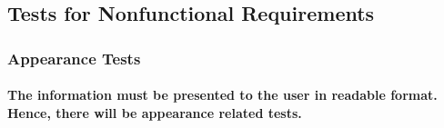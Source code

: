 \documentclass[12pt, titlepage]{article}
\begin{document}
\subsection{Tests for Nonfunctional Requirements}

\subsubsection{Appearance Tests}
\paragraph{The information must be presented to the user in readable format. Hence, there will be appearance related tests.}
\end{document}
